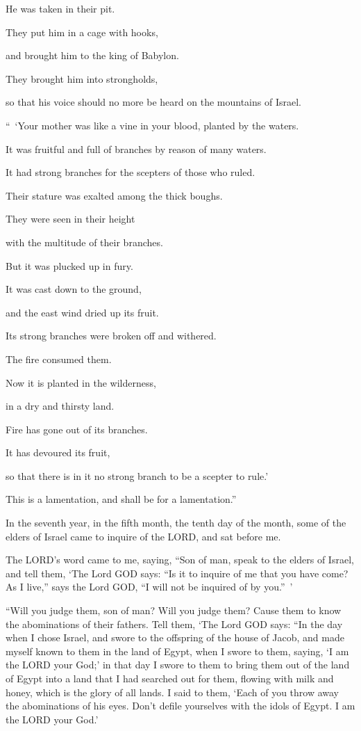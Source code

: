 He was taken in their pit.

\myverse{}They put him in a cage with hooks,

and brought him to the king of Babylon.

They brought him into strongholds,

so that his voice should no more be heard on the mountains of Israel.


\vspace{\baselineskip} \myverse{}“ ‘Your mother was like a vine in your blood, planted by the
waters.

It was fruitful and full of branches by reason of many waters.

\myverse{}It had strong branches for the scepters of those who ruled.

Their stature was exalted among the thick boughs.

They were seen in their height

with the multitude of their branches.

\myverse{}But it was plucked up in fury.

It was cast down to the ground,

and the east wind dried up its fruit.

Its strong branches were broken off and withered.

The fire consumed them.

\myverse{}Now it is planted in the wilderness,

in a dry and thirsty land.

\myverse{}Fire has gone out of its branches.

It has devoured its fruit,

so that there is in it no strong branch to be a scepter to rule.’

This is a lamentation, and shall be for a lamentation.”


\mychapter{} \myverse*{}In the seventh year, in the fifth month, the tenth day of the
month, some of the elders of Israel came to inquire of the LORD, and sat before me.

\myverse{}The LORD’s word came to me, saying,
\myverse{}“Son of man, speak to the elders of Israel, and tell them, ‘The Lord GOD says:
“Is it to inquire of me that you have come? As I live,” says the Lord GOD, “I will not be inquired of
by you.” ’

\myverse{}“Will you judge them, son of man? Will you judge them? Cause them
to know the abominations of their fathers.
\myverse{}Tell them, ‘The Lord GOD says: “In the day when I chose Israel, and swore to
the offspring of the house of Jacob, and made myself known to them in the land of Egypt, when I swore
to them, saying, ‘I am the LORD your God;’
\myverse{}in that day I swore to them to bring them out of the land of Egypt into a land
that I had searched out for them, flowing with milk and honey, which is the glory of all lands.
\myverse{}I said to them, ‘Each of you throw away the abominations of his eyes. Don’t
defile yourselves with the idols of Egypt. I am the LORD your God.’

